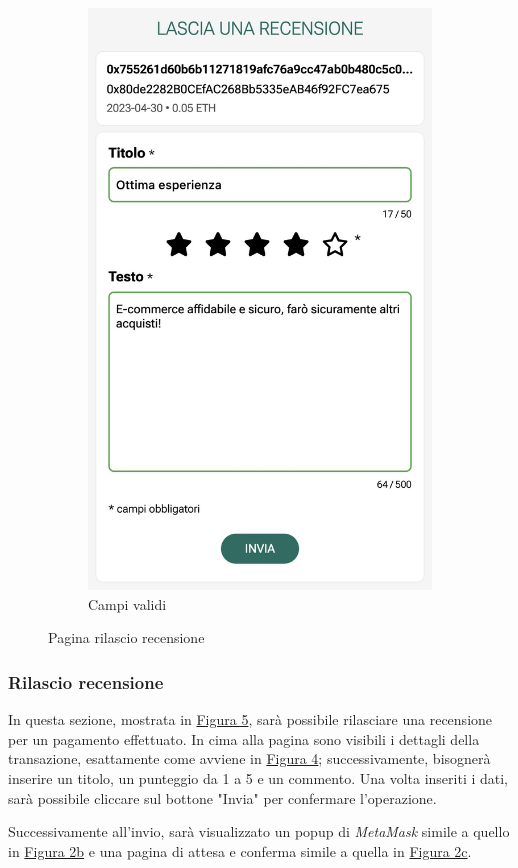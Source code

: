 \begin{figure}[H]
\begin{subfigure}[t]{0.49\textwidth}
    \includegraphics[width=0.7\linewidth]{src/img/rilascio_recensione_valid.jpeg}
    \caption{Campi validi}\label{fig:rilascio_recensione_valid}
    \end{subfigure}

    \caption{Pagina rilascio recensione}\label{fig:rilascio_recensione}
\end{figure}

\subsubsection{Rilascio recensione}
In questa sezione, mostrata in \hyperref[fig:rilascio_recensione]{Figura 5}, sarà possibile rilasciare una recensione per un pagamento effettuato. In cima alla pagina sono visibili i dettagli della transazione, esattamente come avviene in \hyperref[fig:pagamenti]{Figura 4}; successivamente, bisognerà inserire un titolo, un punteggio da 1 a 5 e un commento. Una volta inseriti i dati, sarà possibile cliccare sul bottone "Invia" per confermare l'operazione.

Successivamente all'invio, sarà visualizzato un popup di \textit{MetaMask} simile a quello in \hyperref[fig:checkout_metamask]{Figura 2b} e una pagina di attesa e conferma simile a quella in \hyperref[fig:checkout_conferma]{Figura 2c}.

